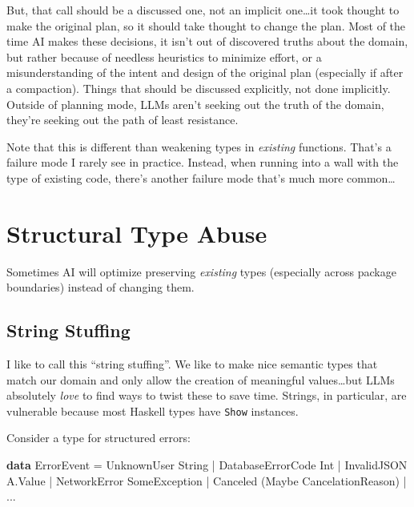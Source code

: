 \documentclass[]{article}
\newenvironment{Shaded}{}{}
\newcommand{\DataTypeTok}[1]{\textcolor[rgb]{0.56,0.13,0.00}{#1}}
\newcommand{\KeywordTok}[1]{\textcolor[rgb]{0.00,0.44,0.13}{\textbf{#1}}}
\newcommand{\NormalTok}[1]{#1}
\newcommand{\OperatorTok}[1]{\textcolor[rgb]{0.40,0.40,0.40}{#1}}
\newcommand{\OtherTok}[1]{\textcolor[rgb]{0.00,0.44,0.13}{#1}}
\begin{document}
But, that call should be a discussed one, not an implicit one\ldots it took
thought to make the original plan, so it should take thought to change the plan.
Most of the time AI makes these decisions, it isn't out of discovered truths
about the domain, but rather because of needless heuristics to minimize effort,
or a misunderstanding of the intent and design of the original plan (especially
if after a compaction). Things that should be discussed explicitly, not done
implicitly. Outside of planning mode, LLMs aren't seeking out the truth of the
domain, they're seeking out the path of least resistance.

Note that this is different than weakening types in \emph{existing} functions.
That's a failure mode I rarely see in practice. Instead, when running into a
wall with the type of existing code, there's another failure mode that's much
more common\ldots{}

\section{Structural Type Abuse}\label{structural-type-abuse}

Sometimes AI will optimize preserving \emph{existing} types (especially across
package boundaries) instead of changing them.

\subsection{String Stuffing}\label{string-stuffing}

I like to call this ``string stuffing''. We like to make nice semantic types
that match our domain and only allow the creation of meaningful values\ldots but
LLMs absolutely \emph{love} to find ways to twist these to save time. Strings,
in particular, are vulnerable because most Haskell types have \texttt{Show}
instances.

Consider a type for structured errors:

\begin{Shaded}
\begin{Highlighting}[]
\KeywordTok{data} \DataTypeTok{ErrorEvent} \OtherTok{=} \DataTypeTok{UnknownUser} \DataTypeTok{String}
                \OperatorTok{|} \DataTypeTok{DatabaseErrorCode} \DataTypeTok{Int}
                \OperatorTok{|} \DataTypeTok{InvalidJSON} \DataTypeTok{A.Value}
                \OperatorTok{|} \DataTypeTok{NetworkError} \DataTypeTok{SomeException}
                \OperatorTok{|} \DataTypeTok{Canceled}\NormalTok{ (}\DataTypeTok{Maybe} \DataTypeTok{CancelationReason}\NormalTok{)}
                \OperatorTok{|} \OperatorTok{...}
\end{Highlighting}
\end{Shaded}
\end{document}
